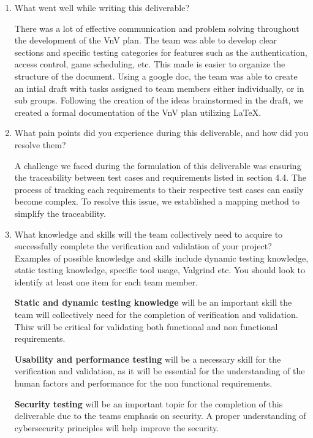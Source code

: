 \documentclass[12pt, titlepage]{article}
\begin{document}
\begin{enumerate}
	\item What went well while writing this deliverable?
	
	There was a lot of effective communication and problem solving throughout the
	development of the VnV plan. The team was able to develop clear sections and 
	specific testing categories for features such as the authentication, access
	control, game scheduling, etc. This made is easier to organize the structure
	of the document. Using a google doc, the team was able to create an intial 
	draft with tasks assigned to team members either individually, or in sub groups.
	Following the creation of the ideas brainstormed in the draft, we created a 
	formal documentation of the VnV plan utilizing LaTeX.
	
	\item What pain points did you experience during this deliverable, and how
		did you resolve them?
	
		A challenge we faced during the formulation of this deliverable was ensuring
		the traceability between test cases and requirements listed in section 4.4. 
		The process of tracking each requirements to their respective test cases can
		easily become complex. To resolve this issue, we established a mapping method
		to simplify the traceability.
	
	\item What knowledge and skills will the team collectively need to acquire to
	successfully complete the verification and validation of your project?
	Examples of possible knowledge and skills include dynamic testing knowledge,
	static testing knowledge, specific tool usage, Valgrind etc.  You should look to
	identify at least one item for each team member.
	
		\textbf{Static and dynamic testing knowledge} will be an important skill the
		team will collectively need for the completion of verification and validation.
		Thiw will be critical for validating both functional and non functional
		requirements.
	
		\textbf{Usability and performance testing} will be a necessary skill for the 
		verification and validation, as it will be essential for the understanding
		of the human factors and performance for the non functional requirements.
	
		\textbf{Security testing} will be an important topic for the completion of
		this deliverable due to the teams emphasis on security. A proper
		understanding of cybersecurity principles will help improve the security.
	

\end{enumerate}
\end{document}
